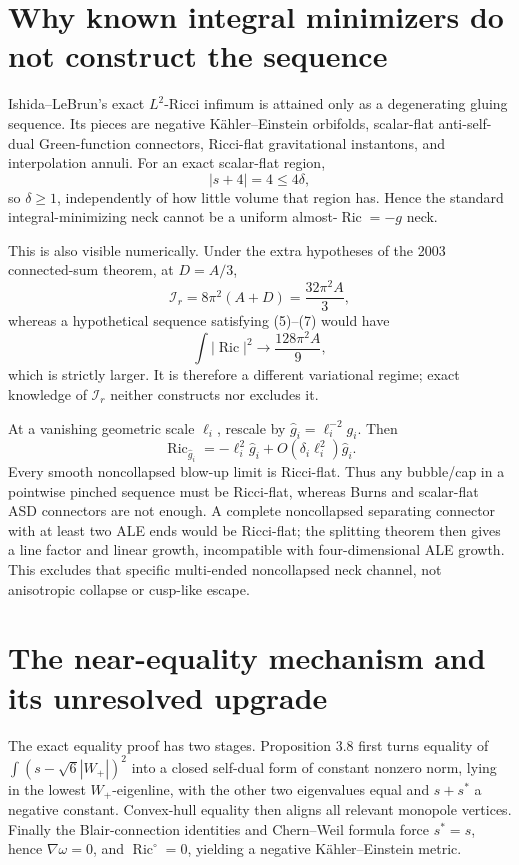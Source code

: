 \section{Why known integral minimizers do not construct the sequence}

Ishida--LeBrun's exact \(L^2\)-Ricci infimum is attained only as a degenerating gluing sequence.  Its pieces are negative K\"ahler--Einstein orbifolds, scalar-flat anti-self-dual Green-function connectors, Ricci-flat gravitational instantons, and interpolation annuli.  For an exact scalar-flat region,
\[
 |s+4|=4\le4\delta,
\]
so \(\delta\ge1\), independently of how little volume that region has.  Hence the standard integral-minimizing neck cannot be a uniform almost-\(\operatorname{Ric}=-g\) neck.

This is also visible numerically.  Under the extra hypotheses of the 2003 connected-sum theorem, at \(D=A/3\),
\[
 \mathcal I_r=8\pi^2(A+D)=\frac{32\pi^2A}{3},
\]
whereas a hypothetical sequence satisfying (5)--(7) would have
\[
 \int|\operatorname{Ric}|^2\to\frac{128\pi^2A}{9},
\]
which is strictly larger.  It is therefore a different variational regime; exact knowledge of \(\mathcal I_r\) neither constructs nor excludes it.

At a vanishing geometric scale \(\ell_i\), rescale by \(\widehat g_i=\ell_i^{-2}g_i\).  Then
\[
 \operatorname{Ric}_{\widehat g_i}
 =-\ell_i^2\widehat g_i+O(\delta_i\ell_i^2)\widehat g_i.
\]
Every smooth noncollapsed blow-up limit is Ricci-flat.  Thus any bubble/cap in a pointwise pinched sequence must be Ricci-flat, whereas Burns and scalar-flat ASD connectors are not enough.  A complete noncollapsed separating connector with at least two ALE ends would be Ricci-flat; the splitting theorem then gives a line factor and linear growth, incompatible with four-dimensional ALE growth.  This excludes that specific multi-ended noncollapsed neck channel, not anisotropic collapse or cusp-like escape.

\section{The near-equality mechanism and its unresolved upgrade}

The exact equality proof has two stages.  Proposition 3.8 first turns equality of
\(\int(s-\sqrt6|W_+|)^2\) into a closed self-dual form of constant nonzero norm, lying in the lowest \(W_+\)-eigenline, with the other two eigenvalues equal and \(s+s^*\) a negative constant.  Convex-hull equality then aligns all relevant monopole vertices.  Finally the Blair-connection identities and Chern--Weil formula force \(s^*=s\), hence \(\nabla\omega=0\), and \(\operatorname{Ric}^\circ=0\), yielding a negative K\"ahler--Einstein metric.

